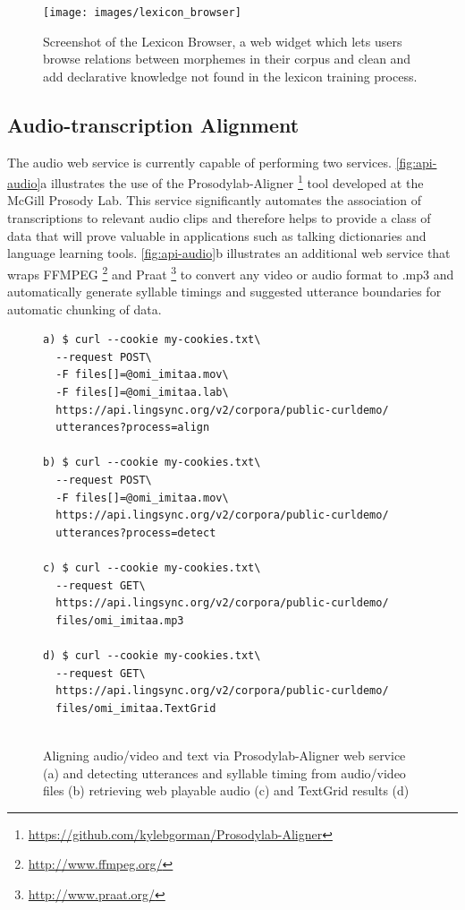\documentclass[11pt]{article}
\begin{document}
\begin{figure}
\begin{center}
\texttt{[image: images/lexicon\_browser]}
\caption{Screenshot of the Lexicon Browser, a web widget which lets users browse relations between morphemes in their corpus and clean and add declarative knowledge not found in the lexicon training process.}
\label{lexicon_browser_screenshot}
\end{center}
\end{figure}


\subsection{Audio-transcription Alignment}
\label{sec:aligner}

The audio web service is currently capable of performing two services.
\autoref{fig:api-audio}a illustrates the use of the
Prosodylab-Aligner%
\footnote{\url{https://github.com/kylebgorman/Prosodylab-Aligner}} %
tool developed at the McGill Prosody Lab. This service significantly automates
the association of transcriptions to relevant audio clips and therefore helps
to provide a class of data that will prove valuable in applications such as
talking dictionaries and language learning tools. \autoref{fig:api-audio}b
illustrates an additional web service that wraps
FFMPEG%
\footnote{\url{http://www.ffmpeg.org/}} %
and Praat%
\footnote{\url{http://www.praat.org/}} %
to convert any video or audio format to .mp3 and automatically generate
syllable timings and suggested utterance boundaries \cite{DeJong:2009} for automatic chunking of
data.


\begin{figure}[h]
\scriptsize
\begin{verbatim}
a) $ curl --cookie my-cookies.txt\
  --request POST\
  -F files[]=@omi_imitaa.mov\
  -F files[]=@omi_imitaa.lab\
  https://api.lingsync.org/v2/corpora/public-curldemo/
  utterances?process=align

b) $ curl --cookie my-cookies.txt\
  --request POST\
  -F files[]=@omi_imitaa.mov\
  https://api.lingsync.org/v2/corpora/public-curldemo/
  utterances?process=detect
  
c) $ curl --cookie my-cookies.txt\
  --request GET\
  https://api.lingsync.org/v2/corpora/public-curldemo/
  files/omi_imitaa.mp3
 
d) $ curl --cookie my-cookies.txt\
  --request GET\
  https://api.lingsync.org/v2/corpora/public-curldemo/
  files/omi_imitaa.TextGrid
   
\end{verbatim}
\caption{Aligning audio/video and text via Prosodylab-Aligner web service (a) and detecting utterances and syllable timing from audio/video files (b) retrieving web playable audio (c) and TextGrid results (d)}
\normalsize
\label{fig:api-audio}
\end{figure}
\end{document}
